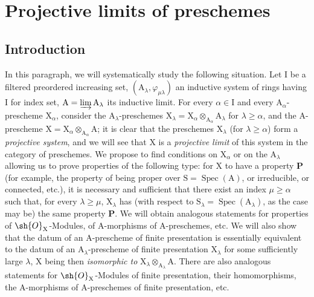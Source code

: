\section{Projective limits of preschemes}
\label{section:IV.8}

\subsection{Introduction}
\label{subsection:IV.8.1}


\begin{env}[8.1.1]
\label{IV.8.1.1}
In this paragraph, we will systematically study the following situation.
Let $\mathrm{I}$ be a filtered preordered increasing set, $(\mathrm{A}_\lambda,\varphi_{\mu\lambda})$ an inductive system of rings having $\mathrm{I}$ for index set, $\mathrm{A}=\varinjlim\mathrm{A}_\lambda$ its inductive limit.
For every $\alpha\in\mathrm{I}$ and every $\mathrm{A}_\alpha$-prescheme $\mathrm{X}_\alpha$, consider the $\mathrm{A}_\lambda$-preschemes $\mathrm{X}_\lambda=\mathrm{X}_\alpha\otimes_{\mathrm{A}_\alpha}\mathrm{A}_\lambda$ for $\lambda\geqslant\alpha$, and the $\mathrm{A}$-prescheme $\mathrm{X}=\mathrm{X}_\alpha\otimes_{\mathrm{A}_\alpha}\mathrm{A}$; it is clear that the preschemes $\mathrm{X}_\lambda$ (for $\lambda\geqslant\alpha$) form a \emph{projective system}, and we will see  that $\mathrm{X}$ is a \emph{projective limit} of this system in the category of preschemes.
We propose to find conditions on $\mathrm{X}_\alpha$ or on the $\mathrm{A}_\lambda$ allowing us to prove properties of the following type:
for $\mathrm{X}$ to have a property $\mathbf{P}$ (for example, the property of being proper over $\mathrm{S}=\operatorname{Spec}(\mathrm{A})$, or irreducible, or connected, etc.), it is necessary and sufficient that there exist an index $\mu\geqslant\alpha$ such that, for every $\lambda\geqslant\mu$, $\mathrm{X}_\lambda$ has (with respect to $\mathrm{S}_\lambda=\operatorname{Spec}(\mathrm{A}_\lambda)$, as the case may be) the same property $\mathbf{P}$.
We will obtain analogous statements for properties of $\sh{O}_\mathrm{X}$-Modules, of $\mathrm{A}$-morphisms of $\mathrm{A}$-preschemes, etc.
We will also show  that the datum of an $\mathrm{A}$-prescheme of finite presentation  is essentially equivalent to the datum of an $\mathrm{A}_\lambda$-prescheme of finite presentation $\mathrm{X}_\lambda$ for some sufficiently large $\lambda$, $\mathrm{X}$ being then \emph{isomorphic to} $\mathrm{X}_\lambda\otimes_{\mathrm{A}_\lambda}\mathrm{A}$.
There are also analogous statements for $\sh{O}_\mathrm{X}$-Modules of finite presentation, their homomorphisms, the $\mathrm{A}$-morphisms of $\mathrm{A}$-preschemes of finite presentation, etc.
\end{env}

